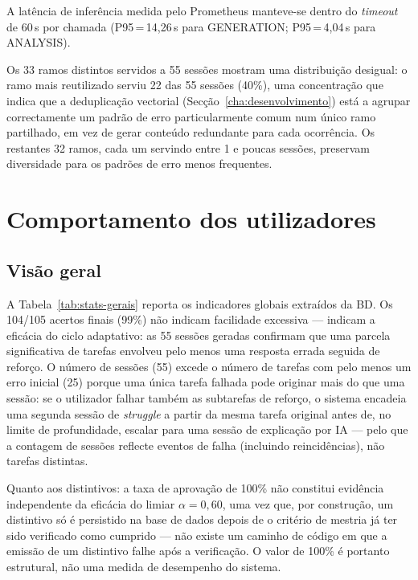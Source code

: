 A latência de inferência medida pelo Prometheus manteve-se dentro do \emph{timeout} de 60\,s por chamada (P95\,=\,14,26\,s para GENERATION; P95\,=\,4,04\,s para ANALYSIS).

Os 33 ramos distintos servidos a 55 sessões mostram uma distribuição desigual: o ramo mais reutilizado serviu 22 das 55 sessões (40\%), uma concentração que indica que a deduplicação vectorial (Secção~\ref{cha:desenvolvimento}) está a agrupar correctamente um padrão de erro particularmente comum num único ramo partilhado, em vez de gerar conteúdo redundante para cada ocorrência. Os restantes 32 ramos, cada um servindo entre 1 e poucas sessões, preservam diversidade para os padrões de erro menos frequentes.

\section{Comportamento dos utilizadores}
\label{sec:comportamento-utilizadores}

\subsection{Visão geral}
\label{ssec:dados-comportamentais}

A Tabela~\ref{tab:stats-gerais} reporta os indicadores globais extraídos da BD. Os 104/105 acertos finais (99\%) não indicam facilidade excessiva --- indicam a eficácia do ciclo adaptativo: as 55 sessões geradas confirmam que uma parcela significativa de tarefas envolveu pelo menos uma resposta errada seguida de reforço. O número de sessões (55) excede o número de tarefas com pelo menos um erro inicial (25) porque uma única tarefa falhada pode originar mais do que uma sessão: se o utilizador falhar também as subtarefas de reforço, o sistema encadeia uma segunda sessão de \emph{struggle} a partir da mesma tarefa original antes de, no limite de profundidade, escalar para uma sessão de explicação por IA --- pelo que a contagem de sessões reflecte eventos de falha (incluindo reincidências), não tarefas distintas.

Quanto aos distintivos: a taxa de aprovação de 100\% não constitui evidência independente da eficácia do limiar $\alpha=0{,}60$, uma vez que, por construção, um distintivo só é persistido na base de dados depois de o critério de mestria já ter sido verificado como cumprido --- não existe um caminho de código em que a emissão de um distintivo falhe após a verificação. O valor de 100\% é portanto estrutural, não uma medida de desempenho do sistema.

